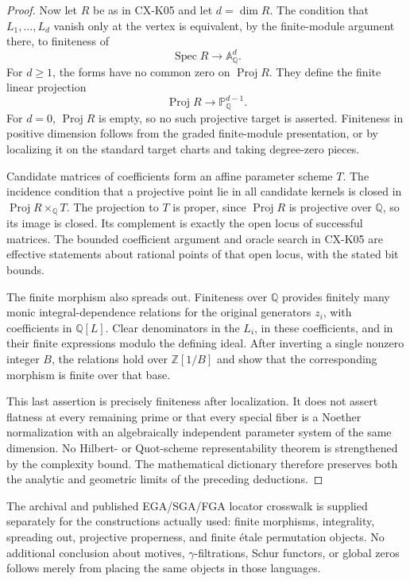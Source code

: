 \documentclass[11pt,a4paper]{article}
\begin{document}
\begin{proof}
Now let $R$ be as in CX-K05 and let $d=\dim R$. The condition that
$L_1,\ldots,L_d$ vanish only at the vertex is equivalent, by the
finite-module argument there, to finiteness of
\[
 \operatorname{Spec}R\longrightarrow\mathbb A_{\mathbb Q}^{d}.
\]
For $d\ge1$, the forms have no common zero on $\operatorname{Proj}R$.
They define the finite linear projection
\[
 \operatorname{Proj}R\longrightarrow\mathbb P_{\mathbb Q}^{d-1}.
\]
For $d=0$, $\operatorname{Proj}R$ is empty, so no such projective
target is asserted. Finiteness in positive dimension follows from the
graded finite-module presentation, or by localizing it on the
standard target charts and taking degree-zero pieces.

Candidate matrices of coefficients form an affine parameter scheme
$T$. The incidence condition that a projective point lie in all
candidate kernels is closed in
$\operatorname{Proj}R\times_{\mathbb Q}T$.
The projection to $T$ is proper, since $\operatorname{Proj}R$ is
projective over $\mathbb Q$, so its image is closed. Its complement
is exactly the open locus of successful matrices. The bounded
coefficient argument and oracle search in CX-K05 are effective
statements about rational points of that open locus, with the stated
bit bounds.

The finite morphism also spreads out. Finiteness over $\mathbb Q$
provides finitely many monic integral-dependence relations for the
original generators $z_i$, with coefficients in $\mathbb Q[L]$.
Clear denominators in the $L_i$, in these coefficients, and in their
finite expressions modulo the defining ideal. After inverting a
single nonzero integer $B$, the relations hold over
$\mathbb Z[1/B]$ and show that the corresponding morphism is finite
over that base.

This last assertion is precisely finiteness after localization. It
does not assert flatness at every remaining prime or that every
special fiber is a Noether normalization with an algebraically
independent parameter system of the same dimension. No
Hilbert- or Quot-scheme representability theorem is strengthened by
the complexity bound. The mathematical dictionary therefore preserves
both the analytic and geometric limits of the preceding deductions.
\end{proof}

The archival and published EGA/SGA/FGA locator crosswalk is supplied
separately for the constructions actually used: finite morphisms,
integrality, spreading out, projective properness, and finite \'etale
permutation objects. No additional conclusion about motives,
$\gamma$-filtrations, Schur functors, or global zeros follows merely
from placing the same objects in those languages.
\end{document}

